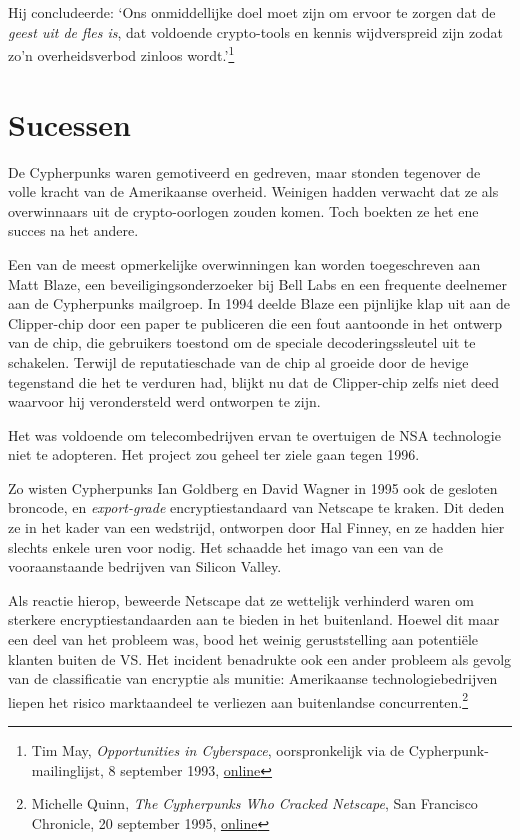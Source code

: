 \documentclass[
  a5paper,
  smalldemyvopaper,11pt,twoside,onecolumn,openright,extrafontsizes,
hidelinks]{memoir}
\begin{document}
Hij concludeerde: `Ons onmiddellijke doel moet zijn om ervoor te zorgen
dat de \emph{geest uit de fles is}, dat voldoende crypto-tools en kennis
wijdverspreid zijn zodat zo'n overheidsverbod zinloos wordt.'\footnote{Tim
  May, \emph{Opportunities in Cyberspace}, oorspronkelijk via de
  Cypherpunk-mailinglijst, 8 september 1993,
  \href{https://cypherpunks.venona.com/date/1993/09/msg00140.html}{online}}

\section{Sucessen}\label{sucessen}

De Cypherpunks waren gemotiveerd en gedreven, maar stonden tegenover de
volle kracht van de Amerikaanse overheid. Weinigen hadden verwacht dat
ze als overwinnaars uit de crypto-oorlogen zouden komen. Toch boekten ze
het ene succes na het andere.

Een van de meest opmerkelijke overwinningen kan worden toegeschreven aan
Matt Blaze, een beveiligingsonderzoeker bij Bell Labs en een frequente
deelnemer aan de Cypherpunks mailgroep. In 1994 deelde Blaze een
pijnlijke klap uit aan de Clipper-chip door een paper te publiceren die
een fout aantoonde in het ontwerp van de chip, die gebruikers toestond
om de speciale decoderingssleutel uit te schakelen. Terwijl de
reputatieschade van de chip al groeide door de hevige tegenstand die het
te verduren had, blijkt nu dat de Clipper-chip zelfs niet deed waarvoor
hij verondersteld werd ontworpen te zijn.

Het was voldoende om telecombedrijven ervan te overtuigen de NSA
technologie niet te adopteren. Het project zou geheel ter ziele gaan
tegen 1996.

Zo wisten Cypherpunks Ian Goldberg en David Wagner in 1995 ook de
gesloten broncode, en \emph{export-grade} encryptiestandaard van
Netscape te kraken. Dit deden ze in het kader van een wedstrijd,
ontworpen door Hal Finney, en ze hadden hier slechts enkele uren voor
nodig. Het schaadde het imago van een van de vooraanstaande bedrijven
van Silicon Valley.

Als reactie hierop, beweerde Netscape dat ze wettelijk verhinderd waren
om sterkere encryptiestandaarden aan te bieden in het buitenland. Hoewel
dit maar een deel van het probleem was, bood het weinig geruststelling
aan potentiële klanten buiten de VS. Het incident benadrukte ook een
ander probleem als gevolg van de classificatie van encryptie als
munitie: Amerikaanse technologiebedrijven liepen het risico marktaandeel
te verliezen aan buitenlandse concurrenten.\footnote{Michelle Quinn,
  \emph{The Cypherpunks Who Cracked Netscape}, San Francisco Chronicle,
  20 september 1995,
  \href{https://people.eecs.berkeley.edu//~daw/press/iang/ian1.html}{online}}
\end{document}
